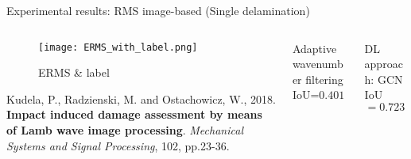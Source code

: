 \documentclass[10pt,aspectratio=169,dvipsnames]{beamer} %
\begin{document}
	\setcounter{subfigure}{0}		%
	\begin{frame}{Experimental results: RMS image-based (Single delamination)}
		\begin{columns}[T]
			\begin{column}[t]{.25\textwidth}
				\begin{figure}[ht!]
					\centering
					\captionsetup{justification=centering}
					\texttt{[image: ERMS\_with\_label.png]}
					\caption{ERMS \& label}
				\end{figure}
				\justifying
				\tiny
				Kudela, P., Radzienski, M. and Ostachowicz, W., 2018. \textbf{Impact induced damage assessment by means of Lamb wave image processing}. \textit{Mechanical Systems and Signal Processing}, 102, pp.23-36.
			\end{column}
			\begin{column}[t]{0.5\textwidth}
				\begin{block}{Adaptive wavenumber filtering}
					\centering
					\footnotesize
					IoU=$0.401$
					\begin{figure}[ht!]
						\centering
						\captionsetup{justification=centering}
						\quad
					\end{figure}
				\end{block}					
			\end{column}		
			\begin{column}[t]{0.25\textwidth}
				\begin{alertblock}{DL approach: GCN}
					\centering
					\footnotesize
					IoU\(=0.723\)
					\begin{figure}[ht!]	
						\centering				
					\end{figure} 	
				\end{alertblock}				
			\end{column}
		\end{columns}	
	\end{frame}
	\setcounter{subfigure}{0}
\end{document}
